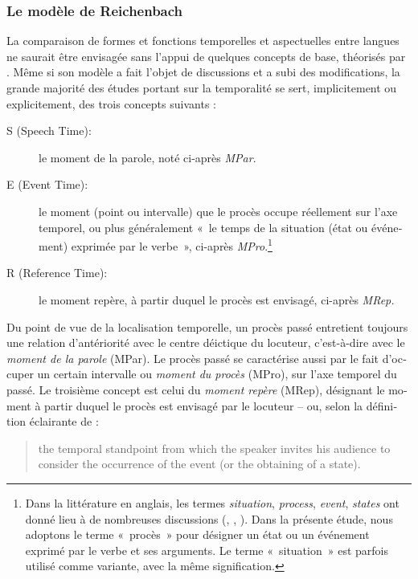 \documentclass[french, output=paper]{langscibook}
\begin{document}
\begin{otherlanguage}{french}
\subsubsection{Le modèle de Reichenbach}\label{sec:kihlstedt:1.1.2}

La comparaison de formes et fonctions temporelles et aspectuelles entre langues ne saurait être envisagée sans l’appui de quelques concepts de base, théorisés par \citet{Reichenbach1947}. Même si son modèle a fait l’objet de discussions et a subi des modifications, la grande majorité des études portant sur la temporalité se sert, implicitement ou explicitement, des trois concepts suivants :


\begin{description}
\item[S (Speech Time):] le moment de la parole, noté ci-après \textit{MPar}.

\item[E (Event Time):] le moment (point ou intervalle) que le procès occupe réellement sur l’axe temporel, ou plus généralement «~le temps de la situation (état ou événement) exprimée par le verbe~», ci-après \textit{MPro}.\footnote{Dans la littérature en anglais, les termes \textit{situation}, \textit{process}, \textit{event}, \textit{states} ont donné lieu à de nombreuses discussions (\citealt{Comrie1976}, \citealt{Smith1991}, \citealt{Klein1994}). Dans la présente étude, nous adoptons le terme «~{procès}~» \citep{Noyau1998} pour désigner un état ou un événement exprimé par le verbe et ses arguments. Le terme «~{situation}~» est parfois utilisé comme variante, avec la même signification.}

\item[R (Reference Time):] le moment repère, à partir duquel le procès est envisagé, ci-après \textit{MRep.}
\end{description}

Du point de vue de la localisation temporelle, un procès passé entretient toujours une relation d’antériorité avec le centre déictique du locuteur, c’est-à-dire avec le \textit{moment de la parole} (MPar). Le procès passé se caractérise aussi par le fait d’occuper un certain intervalle ou \textit{moment du procès} (MPro), sur l’axe temporel du passé. Le troisième concept est celui du \textit{moment repère} (MRep), désignant le moment à partir duquel le procès est envisagé par le locuteur -- ou, selon la définition éclairante de \citet[203]{Taylor1977} :


\begin{quote}
the temporal standpoint from which the speaker invites his audience to consider the occurrence of the event (or the obtaining of a state).
\end{quote}



\end{otherlanguage}
\end{document}
